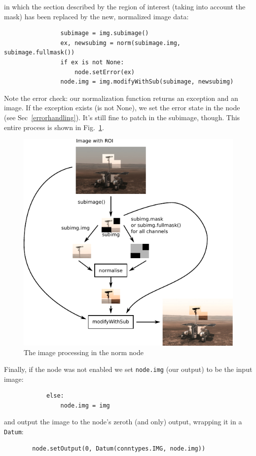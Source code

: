 in which the section described by the region of interest (taking into account the mask)
has been replaced by the new, normalized image data:
\begin{lstlisting}
                subimage = img.subimage()
                ex, newsubimg = norm(subimage.img, subimage.fullmask())
                if ex is not None:
                    node.setError(ex)
                node.img = img.modifyWithSub(subimage, newsubimg)
\end{lstlisting}
Note the error check: our normalization function returns an exception and an
image. If the exception exists (is not None), we set the error state in the
node (see Sec~\ref{errorhandling}). It's still fine to patch in the subimage,
though. This entire process is shown in Fig.~\ref{norm.pdf}.

\begin{figure}[ht]
\center
\includegraphics[width=5in]{norm.pdf}
\caption{The image processing in the norm node}
\label{norm.pdf}
\end{figure}
\clearpage
Finally, if the node was not enabled we set \texttt{node.img} (our output)
to be the input image:
\begin{lstlisting}
            else:
                node.img = img
\end{lstlisting}
and output the image to the node's zeroth (and only) output, wrapping it in
a \texttt{Datum}:
\begin{lstlisting}
        node.setOutput(0, Datum(conntypes.IMG, node.img))
\end{lstlisting}


